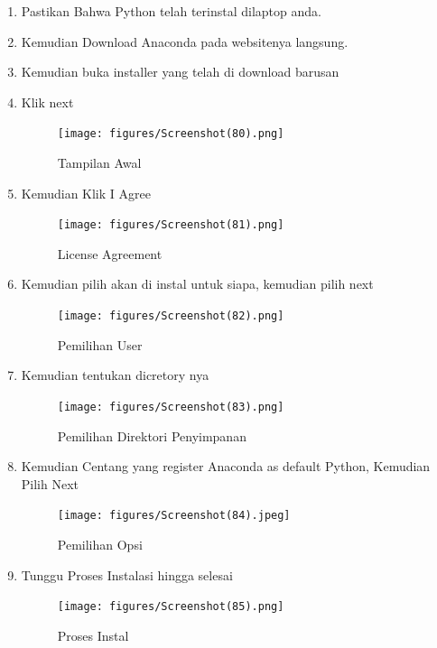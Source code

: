 \begin{enumerate}
    \item Pastikan Bahwa Python telah terinstal dilaptop anda.
    \item Kemudian Download Anaconda pada websitenya langsung.
    \item Kemudian buka installer yang telah di download barusan
    \item Klik next
    \begin{figure}[!Htbp]
        \centering
        \texttt{[image: figures/Screenshot(80).png]}
        \caption{Tampilan Awal}
        \label{awal}
        \end{figure}

    \item Kemudian Klik I Agree
    \begin{figure}[!Htbp]
        \centering
        \texttt{[image: figures/Screenshot(81).png]}
        \caption{License Agreement}
        \label{License}
        \end{figure}

    \item Kemudian pilih akan di instal untuk siapa, kemudian pilih next
    \begin{figure}[!Htbp]
        \centering
        \texttt{[image: figures/Screenshot(82).png]}
        \caption{Pemilihan User}
        \label{User}
        \end{figure}

    \item Kemudian tentukan dicretory nya
    \begin{figure}[!Htbp]
        \centering
        \texttt{[image: figures/Screenshot(83).png]}
        \caption{Pemilihan Direktori Penyimpanan}
        \label{Directory}
        \end{figure}

    \item Kemudian Centang yang register Anaconda as default Python, Kemudian Pilih Next
    \begin{figure}[!Htbp]
        \centering
        \texttt{[image: figures/Screenshot(84).jpeg]}
        \caption{Pemilihan Opsi}
        \label{opsi}
        \end{figure}

    \item Tunggu Proses Instalasi hingga selesai
    \begin{figure}[!Htbp]
        \centering
        \texttt{[image: figures/Screenshot(85).png]}
        \caption{Proses Instal}
        \label{Proses}
        \end{figure}


\end{enumerate}
